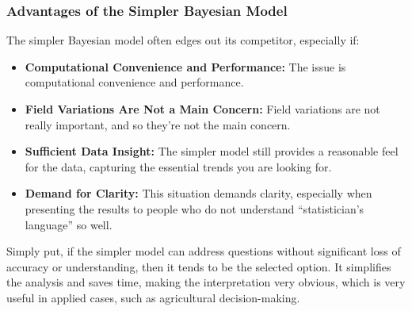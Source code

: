 \documentclass[
]{article}
\begin{document}
\subsubsection{Advantages of the Simpler Bayesian
Model}\label{advantages-of-the-simpler-bayesian-model}

The simpler Bayesian model often edges out its competitor, especially
if:

\begin{itemize}
\item
  \textbf{Computational Convenience and Performance:} The issue is
  computational convenience and performance.
\item
  \textbf{Field Variations Are Not a Main Concern:} Field variations are
  not really important, and so they're not the main concern.
\item
  \textbf{Sufficient Data Insight:} The simpler model still provides a
  reasonable feel for the data, capturing the essential trends you are
  looking for.
\item
  \textbf{Demand for Clarity:} This situation demands clarity,
  especially when presenting the results to people who do not understand
  ``statistician's language'' so well.
\end{itemize}

Simply put, if the simpler model can address questions without
significant loss of accuracy or understanding, then it tends to be the
selected option. It simplifies the analysis and saves time, making the
interpretation very obvious, which is very useful in applied cases, such
as agricultural decision-making.
\end{document}
